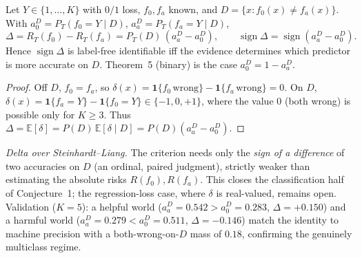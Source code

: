 \begin{theorem}\label{thm:multiclass}
Let $Y\in\{1,\dots,K\}$ with $0/1$ loss, $f_0,f_a$ known, and $D=\{x:f_0(x)\ne f_a(x)\}$. With
$a_0^D=P_T(f_0{=}Y\mid D)$, $a_a^D=P_T(f_a{=}Y\mid D)$,
\[
\Delta=R_T(f_0)-R_T(f_a)=P_T(D)\,(a_a^D-a_0^D),\qquad
\operatorname{sign}\Delta=\operatorname{sign}(a_a^D-a_0^D).
\]
Hence $\operatorname{sign}\Delta$ is label-free identifiable iff the evidence determines which
predictor is more accurate on $D$. Theorem~5 (binary) is the case $a_0^D=1-a_a^D$.
\end{theorem}
\begin{proof}
Off $D$, $f_0=f_a$, so $\delta(x)=\mathbf1\{f_0\,\text{wrong}\}-\mathbf1\{f_a\,\text{wrong}\}=0$. On
$D$, $\delta(x)=\mathbf1\{f_a{=}Y\}-\mathbf1\{f_0{=}Y\}\in\{-1,0,+1\}$, where the value $0$ (both wrong)
is possible only for $K\ge3$. Thus $\Delta=\mathbb E[\delta]=P(D)\,\mathbb E[\delta\mid D]=P(D)(a_a^D-a_0^D)$.
\end{proof}
\noindent\emph{Delta over Steinhardt--Liang.} The criterion needs only the \emph{sign of a difference}
of two accuracies on $D$ (an ordinal, paired judgment), strictly weaker than estimating the absolute
risks $R(f_0),R(f_a)$. This closes the classification half of Conjecture~1; the regression-loss case,
where $\delta$ is real-valued, remains open. Validation ($K{=}5$): a helpful world
($a_a^D{=}0.542>a_0^D{=}0.283$, $\Delta{=}{+}0.150$) and a harmful world
($a_a^D{=}0.279<a_0^D{=}0.511$, $\Delta{=}{-}0.146$) match the identity to machine precision with a
both-wrong-on-$D$ mass of $0.18$, confirming the genuinely multiclass regime.
